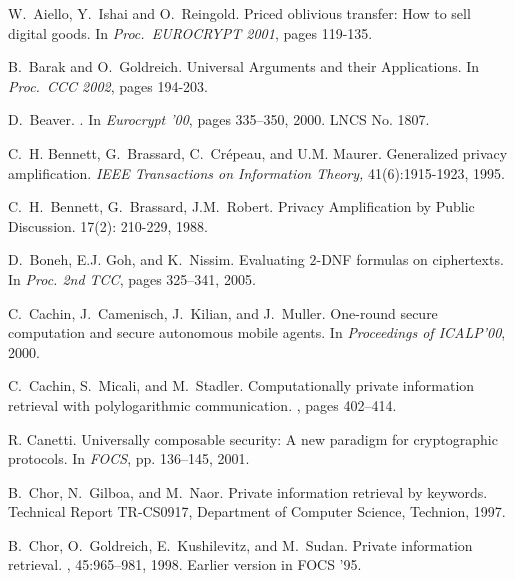 \documentclass[11pt]{article}
\begin{document}
\begin{footnotesize}
	\begin{thebibliography}{10}
		
		W.~Aiello, Y.~Ishai and O.~Reingold.
		\newblock Priced oblivious transfer: How to sell digital goods.
		\newblock In {\em Proc.\ EUROCRYPT 2001}, pages 119-135.
		
		B.~Barak and O.~Goldreich.
		\newblock  Universal Arguments and their
		Applications.
		\newblock In {\em Proc.\ CCC 2002}, pages 194-203.
		
		D.~Beaver.
		.
		\newblock In {\em Eurocrypt '00}, pages 335--350, 2000.
		\newblock LNCS No. 1807.
		
		 C.~H. Bennett, G.~Brassard, C.~Cr{\'e}peau, and U.M.
		Maurer.
		\newblock Generalized privacy amplification. {\em IEEE Transactions on
			Information Theory,} 41(6):1915-1923, 1995.
		
		 C.~H.~Bennett, G.~Brassard, J.M.~Robert.
		\newblock Privacy Amplification by Public Discussion.
		 17(2): 210-229, 1988.
		
		D.~Boneh, E.J. Goh, and K.~Nissim.
		\newblock Evaluating $2$-{DNF} formulas on ciphertexts.
		\newblock In {\em Proc. 2nd TCC}, pages 325--341, 2005.
		
		 C.~Cachin, J.~Camenisch, J.~Kilian, and J.~Muller.
		\newblock One-round secure computation and secure autonomous mobile
		agents.  
		\newblock In {\em Proceedings of ICALP'00}, 2000.
		
		C.~Cachin, S.~Micali, and M.~Stadler.
		\newblock Computationally private information retrieval with polylogarithmic
		communication.
		, pages 402--414.
		
		 R. Canetti.  \newblock Universally composable
		security: A new paradigm for cryptographic
		protocols. \newblock In {\em FOCS}, pp. 136--145, 2001.
		
		
		B.~Chor, N.~Gilboa, and M.~Naor.
		\newblock Private information retrieval by keywords.
		\newblock Technical Report TR-CS0917, Department of Computer Science, Technion,
		1997.
		
		B.~Chor, O.~Goldreich, E.~Kushilevitz, and M.~Sudan.
		\newblock Private information retrieval.
		, 45:965--981, 1998.
		\newblock Earlier version in FOCS '95.
		

\end{thebibliography}
\end{footnotesize}
\end{document}

